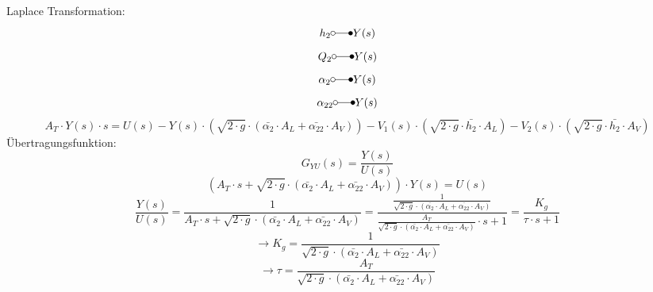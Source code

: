 Laplace Transformation: 
\[ h_2          \laplace Y(s) \]
\[ Q_2          \laplace Y(s) \]
\[ \alpha_2     \laplace Y(s) \]
\[ \alpha_{22}  \laplace Y(s) \]
\[ A_T \cdot Y(s) \cdot s = U(s) 
    - Y(s)   \cdot \left(\sqrt{2 \cdot g} \cdot (\bar{\alpha_2} \cdot A_L + \bar{\alpha_{22}} \cdot A_V)\right)
    - V_1(s) \cdot \left(\sqrt{2 \cdot g} \cdot \bar{h_2} \cdot A_L\right)
    - V_2(s) \cdot \left(\sqrt{2 \cdot g} \cdot \bar{h_2} \cdot A_V\right)
\]
Übertragungsfunktion: 
\[ G_{YU}(s) = \frac{Y(s)}{U(s)} \]
\[ \left(A_T \cdot s 
    + \sqrt{2 \cdot g} \cdot (\bar{\alpha_2} \cdot A_L + \bar{\alpha_{22}} \cdot A_V)\right) \cdot Y(s) = U(s) 
\]
\[ \frac{Y(s)}{U(s)} 
    = \frac{1}{A_T \cdot s + 
    \sqrt{2 \cdot g} \cdot (\bar{\alpha_2} \cdot A_L + \bar{\alpha_{22}} \cdot A_V)}
    = \frac{\frac{1}{\sqrt{2 \cdot g} \cdot (\bar{\alpha_2} \cdot A_L + \bar{\alpha_{22}} \cdot A_V)}}
    {\frac{A_T}{\sqrt{2 \cdot g} \cdot (\bar{\alpha_2} \cdot A_L + \bar{\alpha_{22}} \cdot A_V)} \cdot s + 1}
    = \frac{K_g}{\tau \cdot s + 1}
\]
\[ \to K_g = \frac{1}{\sqrt{2 \cdot g} \cdot (\bar{\alpha_2} \cdot A_L + \bar{\alpha_{22}} \cdot A_V)} \]
\[ \to \tau = \frac{A_T}{\sqrt{2 \cdot g} \cdot (\bar{\alpha_2} \cdot A_L + \bar{\alpha_{22}} \cdot A_V)} \]

